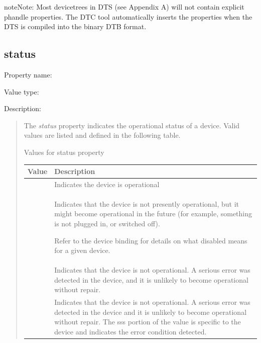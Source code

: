 \documentclass[a4paper,10pt,oneside]{sphinxmanual}
\begin{document}
\begin{notice}{note}{Note:}
Most devicetrees in \textsc{DTS} (see Appendix A) will not
contain explicit phandle properties. The DTC tool automatically inserts
the  properties when the DTS is compiled into the binary DTB
format.
\end{notice}


\subsection{status}
\label{devicetree-basics:status}
Property name: 

Value type: 

Description:
\begin{quote}

The \emph{status} property indicates the operational status of a device.
Valid values are listed and defined in the following table.


\begin{threeparttable}
\capstart\caption{Values for status property}\label{devicetree-basics:id8}
\begin{tabulary}{\linewidth}{l J}
\hline
\textsf{\relax 
Value
} & \textsf{\relax 
Description
}\\
\hline
{}
 & 
Indicates the device is operational
\\
\hline
{}
 & 
Indicates that the device is not presently operational, but it
might become operational in the future (for example, something
is not plugged in, or switched off).

Refer to the device binding for details on what disabled means
for a given device.
\\
\hline
{}
 & 
Indicates that the device is not operational. A serious error
was detected in the device, and it is unlikely to become
operational without repair.
\\
\hline
{}
 & 
Indicates that the device is not operational. A serious error
was detected in the device and it is unlikely to become
operational without repair. The sss portion of the value is
specific to the device and indicates the error condition
detected.
\\
\hline\end{tabulary}

\end{threeparttable}

\end{quote}
\end{document}
